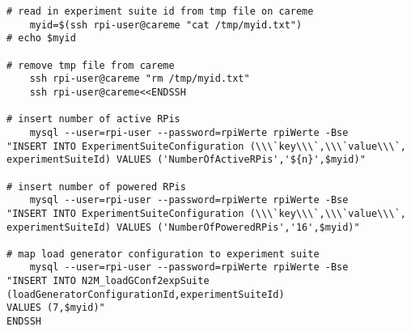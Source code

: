 \begin{verbatim}
# read in experiment suite id from tmp file on careme                                                                                                                       
	myid=$(ssh rpi-user@careme "cat /tmp/myid.txt")
# echo $myid                                                                                                                                                                

# remove tmp file from careme                                                                                                                                                                                                                                                                                                                          
	ssh rpi-user@careme "rm /tmp/myid.txt"
	ssh rpi-user@careme<<ENDSSH                                                                                                                                                
                                                                                                                                                                            
# insert number of active RPis
	mysql --user=rpi-user --password=rpiWerte rpiWerte -Bse 
"INSERT INTO ExperimentSuiteConfiguration (\\\`key\\\`,\\\`value\\\`,
experimentSuiteId) VALUES ('NumberOfActiveRPis','${n}',$myid)"                                                                                                                                                           

# insert number of powered RPis                                 
	mysql --user=rpi-user --password=rpiWerte rpiWerte -Bse 
"INSERT INTO ExperimentSuiteConfiguration (\\\`key\\\`,\\\`value\\\`,
experimentSuiteId) VALUES ('NumberOfPoweredRPis','16',$myid)"                                                                                                                                                            

# map load generator configuration to experiment suite                                                                                                                     
	mysql --user=rpi-user --password=rpiWerte rpiWerte -Bse 
"INSERT INTO N2M_loadGConf2expSuite (loadGeneratorConfigurationId,experimentSuiteId) 
VALUES (7,$myid)"             
ENDSSH


\end{verbatim}
